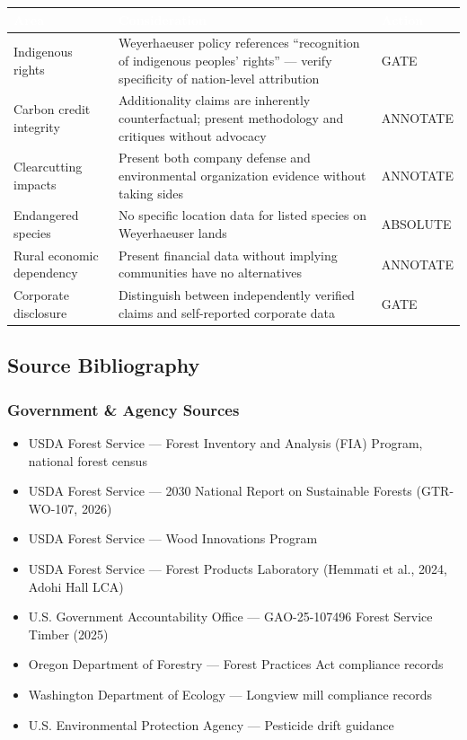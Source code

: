 \documentclass[11pt,letterpaper]{article}
\newcommand{\tableheader}[1]{\textbf{\sffamily\textcolor{white}{#1}}}
\begin{document}
\begin{center}
\begin{tabularx}{\textwidth}{L{3.5cm}XC{2cm}}
\toprule
{}
\tableheader{Area} & \tableheader{Consideration} & \tableheader{Action} \\
\midrule
Indigenous rights & Weyerhaeuser policy references ``recognition of indigenous peoples' rights'' --- verify specificity of nation-level attribution & GATE \\
Carbon credit integrity & Additionality claims are inherently counterfactual; present methodology and critiques without advocacy & ANNOTATE \\
Clearcutting impacts & Present both company defense and environmental organization evidence without taking sides & ANNOTATE \\
Endangered species & No specific location data for listed species on Weyerhaeuser lands & ABSOLUTE \\
Rural economic dependency & Present financial data without implying communities have no alternatives & ANNOTATE \\
Corporate disclosure & Distinguish between independently verified claims and self-reported corporate data & GATE \\
\bottomrule
\end{tabularx}
\end{center}

\subsection{Source Bibliography}

\subsubsection{Government \& Agency Sources}

\begin{itemize}[leftmargin=2em]
\item USDA Forest Service --- Forest Inventory and Analysis (FIA) Program, national forest census
\item USDA Forest Service --- 2030 National Report on Sustainable Forests (GTR-WO-107, 2026)
\item USDA Forest Service --- Wood Innovations Program
\item USDA Forest Service --- Forest Products Laboratory (Hemmati et al., 2024, Adohi Hall LCA)
\item U.S. Government Accountability Office --- GAO-25-107496 Forest Service Timber (2025)
\item Oregon Department of Forestry --- Forest Practices Act compliance records
\item Washington Department of Ecology --- Longview mill compliance records
\item U.S. Environmental Protection Agency --- Pesticide drift guidance
\end{itemize}
\end{document}
